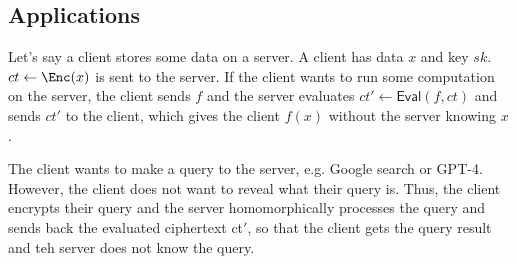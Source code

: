 \subsection{Applications}
\begin{example}
    Let's say a client stores some data on a server. A client has data $x$ and key $sk$. $ct\leftarrow\Enc(x)$ is sent to the server. If the client wants to run some computation on the server, the client sends $f$ and the server evaluates $ct' \leftarrow \mathsf{Eval}(f, ct)$ and sends $ct'$ to the client, which gives the client $f(x)$ without the server knowing $x$.
    
\end{example}

\begin{example}
    The client wants to make a query to the server, e.g. Google search or GPT-4. However, the client does not want to reveal what their query is. Thus, the client encrypts their query and the server homomorphically processes the query and sends back the evaluated ciphertext ct$'$, so that the client gets the query result and teh server does not know the query.

\end{example}

